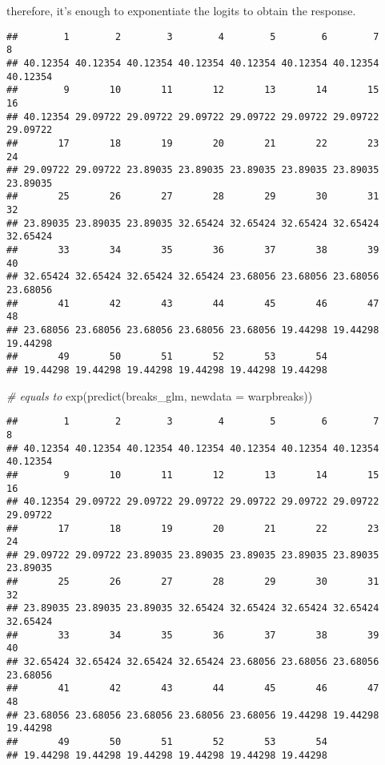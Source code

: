 \documentclass[
  oneside]{book}
\newenvironment{Shaded}{\begin{snugshade}}{\end{snugshade}}
\newcommand{\AttributeTok}[1]{\textcolor[rgb]{0.77,0.63,0.00}{#1}}
\newcommand{\CommentTok}[1]{\textcolor[rgb]{0.56,0.35,0.01}{\textit{#1}}}
\newcommand{\FunctionTok}[1]{\textcolor[rgb]{0.00,0.00,0.00}{#1}}
\newcommand{\NormalTok}[1]{#1}
\newcommand{\SpecialCharTok}[1]{\textcolor[rgb]{0.00,0.00,0.00}{#1}}
\begin{document}
therefore, it's enough to exponentiate the logits to obtain
the response.

\begin{Shaded}
\end{Shaded}

\begin{verbatim}
##        1        2        3        4        5        6        7        8 
## 40.12354 40.12354 40.12354 40.12354 40.12354 40.12354 40.12354 40.12354 
##        9       10       11       12       13       14       15       16 
## 40.12354 29.09722 29.09722 29.09722 29.09722 29.09722 29.09722 29.09722 
##       17       18       19       20       21       22       23       24 
## 29.09722 29.09722 23.89035 23.89035 23.89035 23.89035 23.89035 23.89035 
##       25       26       27       28       29       30       31       32 
## 23.89035 23.89035 23.89035 32.65424 32.65424 32.65424 32.65424 32.65424 
##       33       34       35       36       37       38       39       40 
## 32.65424 32.65424 32.65424 32.65424 23.68056 23.68056 23.68056 23.68056 
##       41       42       43       44       45       46       47       48 
## 23.68056 23.68056 23.68056 23.68056 23.68056 19.44298 19.44298 19.44298 
##       49       50       51       52       53       54 
## 19.44298 19.44298 19.44298 19.44298 19.44298 19.44298
\end{verbatim}

\begin{Shaded}
\begin{Highlighting}[]
\CommentTok{\# equals to}
\FunctionTok{exp}\NormalTok{(}\FunctionTok{predict}\NormalTok{(breaks\_glm, }\AttributeTok{newdata =}\NormalTok{ warpbreaks))}
\end{Highlighting}
\end{Shaded}

\begin{verbatim}
##        1        2        3        4        5        6        7        8 
## 40.12354 40.12354 40.12354 40.12354 40.12354 40.12354 40.12354 40.12354 
##        9       10       11       12       13       14       15       16 
## 40.12354 29.09722 29.09722 29.09722 29.09722 29.09722 29.09722 29.09722 
##       17       18       19       20       21       22       23       24 
## 29.09722 29.09722 23.89035 23.89035 23.89035 23.89035 23.89035 23.89035 
##       25       26       27       28       29       30       31       32 
## 23.89035 23.89035 23.89035 32.65424 32.65424 32.65424 32.65424 32.65424 
##       33       34       35       36       37       38       39       40 
## 32.65424 32.65424 32.65424 32.65424 23.68056 23.68056 23.68056 23.68056 
##       41       42       43       44       45       46       47       48 
## 23.68056 23.68056 23.68056 23.68056 23.68056 19.44298 19.44298 19.44298 
##       49       50       51       52       53       54 
## 19.44298 19.44298 19.44298 19.44298 19.44298 19.44298
\end{verbatim}
\end{document}
